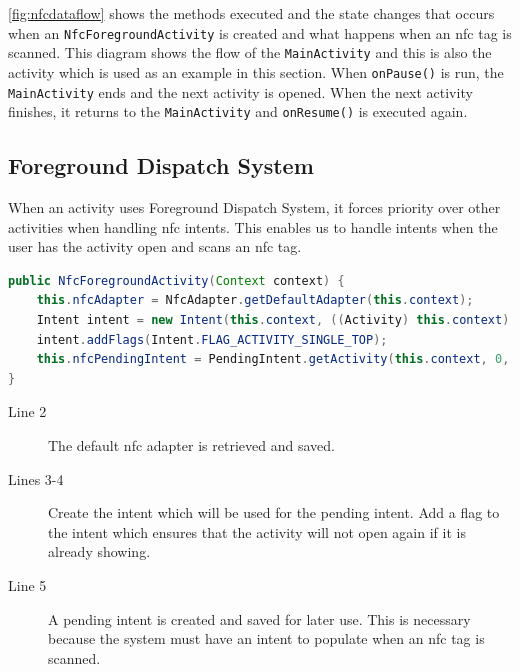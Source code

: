 \autoref{fig:nfcdataflow} shows the methods executed and the state changes that occurs when an \lstinline|NfcForegroundActivity| is created and what happens when an \ac{nfc} tag is scanned. This diagram shows the flow of the \lstinline|MainActivity| and this is also the activity which is used as an example in this section. When \lstinline|onPause()| is run, the \lstinline|MainActivity| ends and the next activity is opened. When the next activity finishes, it returns to the \lstinline|MainActivity| and \lstinline|onResume()| is executed again.

\subsection*{Foreground Dispatch System}
\label{sec:foreground}

When an activity uses Foreground Dispatch System, it forces priority over other activities when handling \ac{nfc} intents\citep{foregroundDispatch}. This enables us to handle intents when the user has the activity open and scans an \ac{nfc} tag.

\begin{lstlisting}[language=java, label=lst:nfcForegroundOnCreate, caption={Initializing the pending intent}]
public NfcForegroundActivity(Context context) { 
    this.nfcAdapter = NfcAdapter.getDefaultAdapter(this.context);
    Intent intent = new Intent(this.context, ((Activity) this.context).getClass());
    intent.addFlags(Intent.FLAG_ACTIVITY_SINGLE_TOP);
    this.nfcPendingIntent = PendingIntent.getActivity(this.context, 0, intent ,0);
}
\end{lstlisting}
\begin{description}
\item[Line 2] The default \ac{nfc} adapter is retrieved and saved.
\item[Lines 3-4] Create the intent which will be used for the pending intent. Add a flag to the intent which ensures that the activity will not open again if it is already showing.
\item[Line 5] A pending intent is created and saved for later use. This is necessary because the system must have an intent to populate when an \ac{nfc} tag is scanned.
\end{description}

